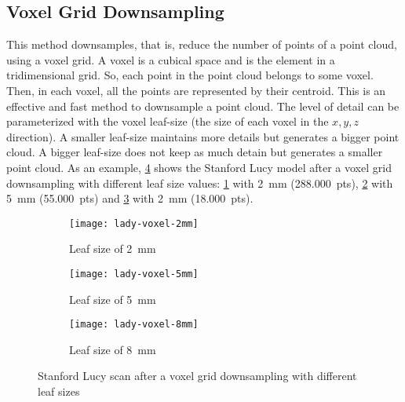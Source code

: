 \subsection{Voxel Grid Downsampling}

This method downsamples, that is, reduce the number of points of a point cloud, using a voxel grid. A voxel is a cubical space and is the element in a tridimensional grid. So, each point in the point cloud belongs to some voxel. Then, in each voxel, all the points are represented by their centroid. This is an effective and fast method to downsample a point cloud. The level of detail can be parameterized with the voxel leaf-size (the size of each voxel in the $x,y,z$ direction). A smaller leaf-size maintains more details but generates a bigger point cloud. A bigger leaf-size does not keep as much detain but generates a smaller point cloud. As an example, \cref{figure:lucy-voxel-grid} shows the Stanford Lucy model \cite{stanford-scanning-rep} after a voxel grid downsampling with different leaf size values: \cref{figure:lucy-voxel-grid-2mm} with \SI{2}{\milli\meter} (288.000~pts), \cref{figure:lucy-voxel-grid-5mm} with \SI{5}{\milli\meter} (55.000~pts) and \cref{figure:lucy-voxel-grid-8mm} with \SI{2}{\milli\meter} (18.000~pts).

\begin{figure}[h]
    
    \centering
    \begin{subfigure}[t]{0.3\textwidth}
        \centering
        \texttt{[image: lady-voxel-2mm]}
        \caption{Leaf size of \SI{2}{\milli\meter}}
        \label{figure:lucy-voxel-grid-2mm}
    \end{subfigure}%
    \begin{subfigure}[t]{0.3\textwidth}
        \centering
        \texttt{[image: lady-voxel-5mm]}
        \caption{Leaf size of \SI{5}{\milli\meter}}
        \label{figure:lucy-voxel-grid-5mm}
    \end{subfigure}%
    \begin{subfigure}[t]{0.3\textwidth}
        \centering
        \texttt{[image: lady-voxel-8mm]}
        \caption{Leaf size of \SI{8}{\milli\meter}}
        \label{figure:lucy-voxel-grid-8mm}
    \end{subfigure}

    \caption{Stanford Lucy scan \cite{stanford-scanning-rep} after a voxel grid downsampling with different leaf sizes}
    \label{figure:lucy-voxel-grid}
\end{figure}